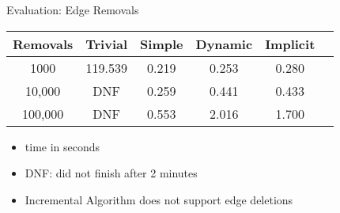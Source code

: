 \documentclass{beamer}
\begin{document}
\begin{frame}{Evaluation: Edge Removals}
  \begin{table}[]
  \begin{tabular}{|c|c|c|c|c|c|}
    \hline
    Removals & Trivial & Simple & Dynamic & Implicit \\
    \hline
    \hline
    1000 & 119.539 & 0.219 & 0.253 & 0.280 \\ %
    \hline
    10,000 & DNF & 0.259 & 0.441 & 0.433 \\
    \hline
    100,000 & DNF & 0.553 & 2.016 & 1.700 \\
    \hline
  \end{tabular}
  \end{table}
  \begin{itemize}
    \item time in seconds
    \item DNF: did not finish after 2 minutes
    \item Incremental Algorithm does not support edge deletions
  \end{itemize}
\end{frame}
\end{document}
